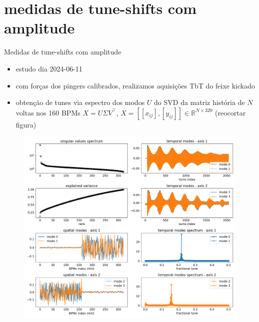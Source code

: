 \documentclass[aspectratio=169]{beamer}            %
\begin{document}
\section{medidas de tune-shifts com amplitude}
\begin{frame}{Medidas de tune-shifts com amplitude}

{\footnotesize
\begin{itemize}
    \item estudo dia 2024-06-11
    \item com forças dos pingers calibrados, realizamos aquisições TbT do feixe kickado
    \item obtenção de tunes via espectro dos modos $U$ do SVD da matriz história de $N$ voltas nos 160 BPMs $X = U \Sigma V^\intercal$, $X = [[x_{ij}], [y_{ij}]] \in \mathbb{R}^{N\times 320}$ (reocortar figura)
\end{itemize}
}
\begin{figure}
    \centering
    \includegraphics[scale=0.2]{2024-06-21/figures/tbt_modal_analysis.png}
\end{figure}
\end{frame}
\end{document}
